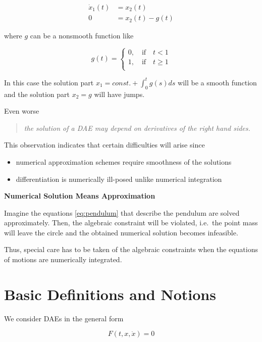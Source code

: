 \documentclass[]{book}
\providecommand{\tightlist}{%
  \setlength{\itemsep}{0pt}\setlength{\parskip}{0pt}}
\theoremstyle{definition}
\theoremstyle{definition}
\theoremstyle{definition}
\theoremstyle{remark}
\begin{document}
\begin{align*}
    \dot x_1(t) &= x_2(t) \\
        0 & = x_2(t) -g(t)
\end{align*}

where \(g\) can be a nonsmooth function like

\[
    g(t) = 
    \begin{cases} 
        0, \quad\text{if}\quad t < 1 \\
        1, \quad\text{if}\quad t \geq 1 \\
    \end{cases}
\]

In this case the solution part \(x_1=const. + \int_0^tg(s)ds\) will be a
smooth function and the solution part \(x_2=g\) will have jumps.

Even worse

\begin{quote}
\emph{the solution of a DAE may depend on derivatives of the right hand
sides.}
\end{quote}

This observation indicates that certain difficulties will arise since

\begin{itemize}
\tightlist
\item
  numerical approximation schemes require smoothness of the solutions
\item
  differentiation is numerically ill-posed unlike numerical integration
\end{itemize}

\textbf{Numerical Solution Means Approximation}

Imagine the equations \eqref{eq:pendulum} that describe the pendulum are
solved approximately. Then, the algebraic constraint will be violated,
i.e.~the point mass will leave the circle and the obtained numerical
solution becomes infeasible.

Thus, special care has to be taken of the algebraic constraints when the
equations of motions are numerically integrated.

\chapter{Basic Definitions and
Notions}\label{basic-definitions-and-notions}

We consider DAEs in the general form

\begin{equation}
    F(t, x, \dot x) = 0
    \label{eq:gendae}
\end{equation}
\end{document}

